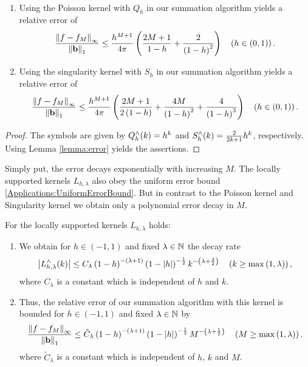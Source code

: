 \begin{lemma}${}^{}$\\[-3.5ex]
 \begin{enumerate}
   \item 
Using the Poisson kernel with $Q_h$ in our summation algorithm yields a relative 
error of
     \begin{equation}
       \label{error:poisson}
       \frac{\left\|f - f_{M}\right\|_{\infty}}{\left\|\mathbf{b}\right\|_1} \le
       \frac{h^{M+1}}{4\pi}
       \left(\frac{2M+1}{1-h}+\frac{2}{\left(1-h\right)^2}\right)\quad \left(h \in (0,1)\right).
     \end{equation}
     \item 
Using the singularity kernel with $S_h$ in our summation algorithm yields 
a relative error of
       \begin{equation}
         \label{error:singular}
         \frac{\left\|f - f_{M}\right\|_{\infty}}{\left\|\mathbf{b}\right\|_1} \le
         \frac{h^{M+1}}{4\pi} \left(\frac{2M+1}{2\left(1-h\right)}+
           \frac{4M}{\left(1-h\right)^2}+
         \frac{4}{\left(1-h\right)^3}\right)\quad \left(h \in (0,1)\right).
       \end{equation}
 \end{enumerate}
\end{lemma}
\begin{proof}
The symbols are given by $Q_{h}^{\wedge}{\hspace{-0.4ex}}\left(k\right)=h^k$ and
$S_{h}^{\wedge}{\hspace{-0.4ex}}\left(k\right)=\frac{2}{2k+1}h^k$, respectively.
Using Lemma \ref{lemma:error} yields the assertions.
\end{proof}
Simply put, the error decays exponentially with increasing $M$.
The locally supported kernels $L_{h,\lambda}$ also obey the uniform error bound
\eqref{Applications:UniformErrorBound}. But in contrast to the Poisson kernel 
and Singularity kernel we obtain only a polynomial error decay in $M$.
\begin{lemma}
  For the locally supported kernels $L_{h,\lambda}$ holds:
  \begin{enumerate}
  \item We obtain for $h \in (-1,1)$ and fixed $\lambda \in \mathbb{N}$ the decay rate
    \[
    \left|L_{h,\lambda}^{\wedge}{\hspace{-0.4ex}}\left(k\right)\right| \le C_{\lambda}
    \left(1-h\right)^{-(\lambda+1)}\left(1-|h|\right)^{-\frac{1}{2}} 
    k^{-\left(\lambda+\frac{3}{2}\right)} \quad \left(k \ge \max{\hspace{-0.4ex}}\left(1,\lambda\right)\right), 
    \]
  where $C_{\lambda}$ is a constant which is independent of $h$ and $k$.
  \item Thus, the relative error of our summation algorithm with this kernel
  is bounded for $h \in (-1,1)$ and fixed $\lambda \in \mathbb{N}$ by
  \begin{equation}
    \label{error:Lh}
    \frac{\left\|f - f_{M}\right\|_{\infty}}{\left\|\mathbf{b}\right\|_1} \le
    \tilde C_{\lambda} \left(1-h\right)^{-(\lambda+1)}\left(1-|h|\right)^{-\frac{1}{2}} 
    M^{-\left(\lambda+\frac{1}{2}\right)} \quad \left(M \ge \max{\hspace{-0.4ex}}\left(1,\lambda\right)\right).
  \end{equation}
where $\tilde C_{\lambda}$ is a constant which is independent of $h$,
$k$ and $M$.
  \end{enumerate}
\end{lemma}

